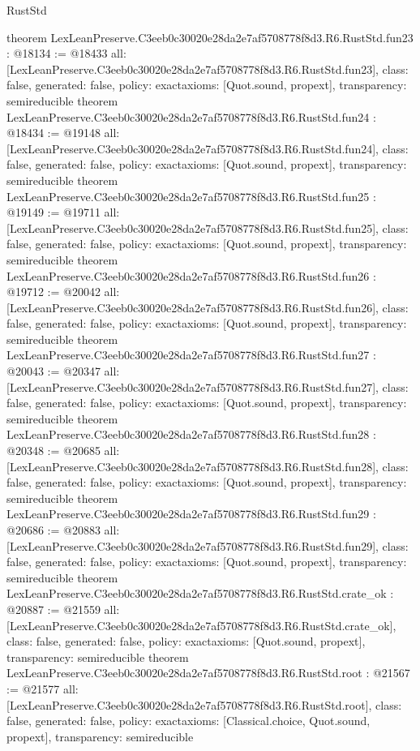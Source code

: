 \begin{lexlean}{RustStd}
\begin{coremodule}
{}
theorem LexLeanPreserve.C3eeb0c30020e28da2e7af5708778f8d3.R6.RustStd.fun23 : @18134 := @18433 {
  all: [LexLeanPreserve.C3eeb0c30020e28da2e7af5708778f8d3.R6.RustStd.fun23],
  class: false,
  generated: false,
  policy: exact{axioms: [Quot.sound, propext]},
  transparency: semireducible
}
theorem LexLeanPreserve.C3eeb0c30020e28da2e7af5708778f8d3.R6.RustStd.fun24 : @18434 := @19148 {
  all: [LexLeanPreserve.C3eeb0c30020e28da2e7af5708778f8d3.R6.RustStd.fun24],
  class: false,
  generated: false,
  policy: exact{axioms: [Quot.sound, propext]},
  transparency: semireducible
}
theorem LexLeanPreserve.C3eeb0c30020e28da2e7af5708778f8d3.R6.RustStd.fun25 : @19149 := @19711 {
  all: [LexLeanPreserve.C3eeb0c30020e28da2e7af5708778f8d3.R6.RustStd.fun25],
  class: false,
  generated: false,
  policy: exact{axioms: [Quot.sound, propext]},
  transparency: semireducible
}
theorem LexLeanPreserve.C3eeb0c30020e28da2e7af5708778f8d3.R6.RustStd.fun26 : @19712 := @20042 {
  all: [LexLeanPreserve.C3eeb0c30020e28da2e7af5708778f8d3.R6.RustStd.fun26],
  class: false,
  generated: false,
  policy: exact{axioms: [Quot.sound, propext]},
  transparency: semireducible
}
theorem LexLeanPreserve.C3eeb0c30020e28da2e7af5708778f8d3.R6.RustStd.fun27 : @20043 := @20347 {
  all: [LexLeanPreserve.C3eeb0c30020e28da2e7af5708778f8d3.R6.RustStd.fun27],
  class: false,
  generated: false,
  policy: exact{axioms: [Quot.sound, propext]},
  transparency: semireducible
}
theorem LexLeanPreserve.C3eeb0c30020e28da2e7af5708778f8d3.R6.RustStd.fun28 : @20348 := @20685 {
  all: [LexLeanPreserve.C3eeb0c30020e28da2e7af5708778f8d3.R6.RustStd.fun28],
  class: false,
  generated: false,
  policy: exact{axioms: [Quot.sound, propext]},
  transparency: semireducible
}
theorem LexLeanPreserve.C3eeb0c30020e28da2e7af5708778f8d3.R6.RustStd.fun29 : @20686 := @20883 {
  all: [LexLeanPreserve.C3eeb0c30020e28da2e7af5708778f8d3.R6.RustStd.fun29],
  class: false,
  generated: false,
  policy: exact{axioms: [Quot.sound, propext]},
  transparency: semireducible
}
theorem LexLeanPreserve.C3eeb0c30020e28da2e7af5708778f8d3.R6.RustStd.crate_ok : @20887 := @21559 {
  all: [LexLeanPreserve.C3eeb0c30020e28da2e7af5708778f8d3.R6.RustStd.crate_ok],
  class: false,
  generated: false,
  policy: exact{axioms: [Quot.sound, propext]},
  transparency: semireducible
}
theorem LexLeanPreserve.C3eeb0c30020e28da2e7af5708778f8d3.R6.RustStd.root : @21567 := @21577 {
  all: [LexLeanPreserve.C3eeb0c30020e28da2e7af5708778f8d3.R6.RustStd.root],
  class: false,
  generated: false,
  policy: exact{axioms: [Classical.choice, Quot.sound, propext]},
  transparency: semireducible
}


\end{coremodule}
\end{lexlean}
